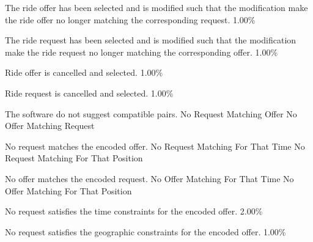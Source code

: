   \startkaosspec
     {The ride offer has been selected and is modified such that the modification make the ride offer no longer matching the corresponding request.}
     {1.00\%}
  \stopkaosspec

  \startkaosspec
     {The ride request has been selected and is modified such that the modification make the ride request no longer matching the corresponding offer.}
     {1.00\%}
  \stopkaosspec

  \startkaosspec
     {Ride offer is cancelled and selected.}
     {1.00\%}
  \stopkaosspec

  \startkaosspec
     {Ride request is cancelled and selected.}
     {1.00\%}
  \stopkaosspec


    {}

  \startkaosspec
  	 {The software do not suggest compatible pairs.}
  	 {No Request Matching Offer}
  	 {No Offer Matching Request}
  \stopkaosspec
  
  \startkaosspec
  	 {No request matches the encoded offer.}
  	 {No Request Matching For That Time}
  	 {No Request Matching For That Position}
  \stopkaosspec
  
  \startkaosspec
  	 {No offer matches the encoded request.}
  	 {No Offer Matching For That Time}
  	 {No Offer Matching For That Position}
  \stopkaosspec
  
  \startkaosspec
  	 {No request satisfies the time constraints for the encoded offer.}
  	 {2.00\%}
  \stopkaosspec
  
  \startkaosspec
  	 {No request satisfies the geographic constraints for the encoded offer.}
  	 {1.00\%}
  \stopkaosspec
  
